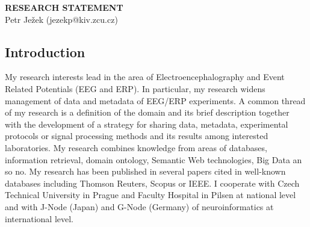 \documentclass[a4paper, 10pt]{article}
\begin{document}
\thispagestyle{fancy}
\lhead{}
\rhead{}
\renewcommand{\headrulewidth}{0pt}
\renewcommand{\footrulewidth}{0pt}
\fancyfoot[C]{\footnotesize \textcolor{gray}{}}

\pagestyle{fancy}
\rhead{\textcolor{gray}{\thepage/\totalpages{}}}



\begin{center}
{\LARGE \bf RESEARCH STATEMENT}\\
\vspace*{0.1cm}
{\normalsize Petr Je\v{z}ek (jezekp@kiv.zcu.cz)}
\end{center}






\subsection*{Introduction}

My research interests lead in the area of Electroencephalography and Event Related Potentials (EEG and ERP). In particular, my research widens management of data and metadata of EEG/ERP experiments. A common thread of my research is a definition of the domain and its brief description together with the development of a strategy for sharing data, metadata, experimental protocols or signal processing methods and its results among interested laboratories. My research combines knowledge from areas of databases, information retrieval, domain ontology, Semantic Web technologies, Big Data an so no. My research has been published in several papers cited in well-known databases including Thomson Reuters, Scopus or IEEE. I cooperate with Czech Technical University in Prague and Faculty Hospital in Pilsen at national level and with J-Node (Japan) and G-Node (Germany) of neuroinformatics at international level.
\end{document}

